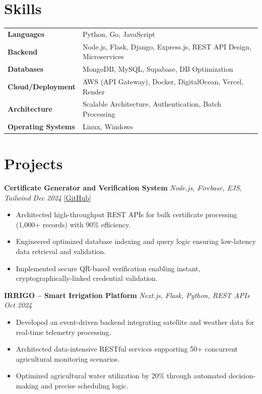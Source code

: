 \documentclass[10pt, a4paper]{article}
\begin{document}
\section*{Skills}

\renewcommand{\arraystretch}{1.0}
\begin{tabular}{@{} >{\bfseries}p{3.8cm} p{13cm} @{}}
Languages           & Python, Go, JavaScript \\
Backend             & Node.js, Flask, Django, Express.js, REST API Design, Microservices \\
Databases           & MongoDB, MySQL, Supabase, DB Optimization \\
Cloud/Deployment    & AWS (API Gateway), Docker, DigitalOcean, Vercel, Render \\
Architecture        & Scalable Architecture, Authentication, Batch Processing \\
Operating Systems   & Linux, Windows \\
\end{tabular}

\section*{Projects}

\textbf{Certificate Generator and Verification System} \hfill \textit{Node.js, Firebase, EJS, Tailwind \quad Dec 2024} \quad \href{https://github.com/bbinxx/advanced-certificate-generator}{[GitHub]}
\begin{itemize}
\item Architected high-throughput REST APIs for bulk certificate processing (1,000+ records) with 90\% efficiency.
\item Engineered optimized database indexing and query logic ensuring low-latency data retrieval and validation.
\item Implemented secure QR-based verification enabling instant, cryptographically-linked credential validation.
\end{itemize}

\vspace{2pt}

\textbf{IRRIGO -- Smart Irrigation Platform} \hfill \textit{Next.js, Flask, Python, REST APIs \quad Oct 2024}
\begin{itemize}
\item Developed an event-driven backend integrating satellite and weather data for real-time telemetry processing.
\item Architected data-intensive RESTful services supporting 50+ concurrent agricultural monitoring scenarios.
\item Optimized agricultural water utilization by 20\% through automated decision-making and precise scheduling logic.
\end{itemize}
\end{document}
